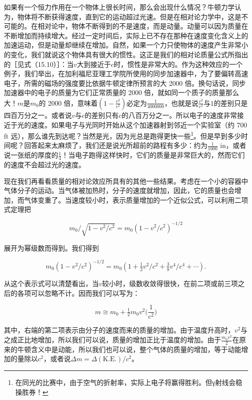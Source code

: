 \documentclass[12pt,oneside]{book}
\begin{document}
如果有一个恒力作用在一个物体上很长时间，那么会出现什么情况？牛顿力学认为，物体将不断获得速度，直到它的运动超过光速。但是在相对论力学中，这是不可能的。在相对论中，物体不断得到的不是速度，而是动量。动量可以因为质量在不断增加而持续增大。经过一定时间后，实际上已不存在那种在速度变化含义上的加速运动，但是动量却继续在增加。自然，如果一个力只使物体的速度产生非常小的变化，我们就说这个物体具有很大的惯性。这正是我们的相对论质量公式所指出的［见式（15.10）］：当$v$大到接近于$c$时，惯性是非常大的。作为这种效应的一个例子，我们举出，在加利福尼亚理工学院所使用的同步加速器中，为了要偏转高速电子，所需的磁场的强度要比依据牛顿定律所预言的大 2000 倍。换句话说，同步加速器中的电子的质量为它们正常质量的 2000 倍，就如同一个质子的质量那么大！$m$是$m_0$的 2000 倍，意味着$(1 - \frac{v^2}{c^2})$必定为$\frac{1}{4000000}$，也就是说$\frac{v^2}{c^2}$与$1$的差别只是四百万分之一。或者说$v$与$c$的差别只有$c$的八百万分之一。所以电子的速度非常接近于光的速度。如果电子与光同时开始从这个加速器射到邻近一个实验室（约 700 ft 远），那么谁先到达呢？当然是光，因为光总是跑得更快一些\footnote{在同光的比赛中，由于空气的折射率，实际上电子将赢得胜利。但γ射线会稳操胜券！}。但是早到多少时间呢？回答起来太麻烦了，我们还是说光所超前的路程有多少：约为$\frac{1}{1000}$ in，或者说一张纸的厚度的$\frac{1}{4}$！当电子跑得这样快时，它们的质量是非常巨大的，然而它们的速度不会超过光的速度。



现在我们再看看质量的相对论效应所具有的其他一些结果。考虑在一个小的容器中气体分子的运动。当气体被加热时，分子的速度就增加，因此，它的质量也会增加，而气体变重了。当速度较小时，表示质量增加的一个近似公式，可以利用二项式定理把

\begin{equation*}
m_0/\sqrt{1 - v^2/c^2} = m_0(1 - v^2/c^2)^{-1/2}
\end{equation*}

展开为幂级数而得到。我们得到

\begin{equation*}
m_0(1 - v^2/c^2)^{-1/2}=m_0(1+\tfrac{1}{2}v^2/c^2+
\tfrac{3}{8}v^4/c^4+\dotsb).
\end{equation*}


从这个表示式可以清楚看出，当$v$较小时，级数收敛得很快，在前二项或前三项之后的各项可以忽略不计。因而我们可以写为：


\begin{equation}
\label{Eq:I:15:11}
m\cong m_0+\tfrac{1}{2}m_0v^2\biggl(\frac{1}{c^2}\biggr)
\end{equation}

其中，右端的第二项表示由分子的速度而来的质量的增加。由于温度升高时，$v^2$与之成正比地增加，所以我们可以说，质量的增加正比于温度的增加。由于$\frac{m_0v^2}{2}$在原来的牛顿含义中是动能，所以我们也可以说，整个气体的质量的增加，等于动能增加的量除以$c^2$，或者说$\Delta m = \Delta(\text{K.E.})/c^2$。
\end{document}
